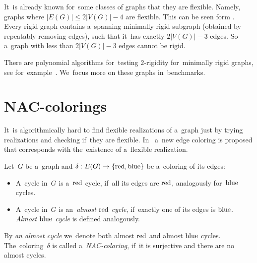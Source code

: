 It~is already known for~some classes of graphs that they are flexible.
Namely, graphs where \( |E(G)| \le 2|V(G)| - 4 \) are flexible.
This can be seen form .
Every rigid graph contains a~spanning minimally rigid subgraph
(obtained by repeatably removing edges),
such that it~has exactly \( 2|V(G)| - 3 \) edges.
So a~graph with less than \( 2|V(G)| - 3 \) edges cannot be rigid.



There are polynomial algorithms for~testing \( 2 \)-rigidity
for~minimally rigid graphs, see for~example~\cite{polynomial-min-rigid}.
We~focus more on these graphs in~benchmarks.


\section{NAC-colorings}

It~is algorithmically hard to find flexible realizations of a~graph
just by trying realizations and checking if~they are flexible.
In~\cite{legersky_original} a~new edge coloring is proposed
that corresponds with the~existence of a~flexible realization.

\begin{definition}
	Let~\( G \) be a~graph and \( \delta: E(G) \to \{ \text{red}, \text{blue} \} \)
	be a~coloring of its edges:
	\begin{itemize}
		\item A~cycle in~\( G \) is a~\( \text{red} \) cycle, if~all its edges are \( \text{red} \),
		      analogously for~\( \text{blue} \) cycles.
		\item A~cycle in~\( G \) is an~\emph{almost \( \text{red} \) cycle},
		      if~exactly one of its edges is \( \text{blue} \).
		      \emph{Almost \( \text{blue} \) cycle} is defined analogously.
	\end{itemize}
	By \emph{an almost cycle} we~denote both almost \( \text{red} \) and almost \( \text{blue} \) cycles.
	The~coloring~\( \delta \) is called a~\emph{NAC-coloring}, if~it is surjective
	and there are no almost cycles.
\end{definition}
%

